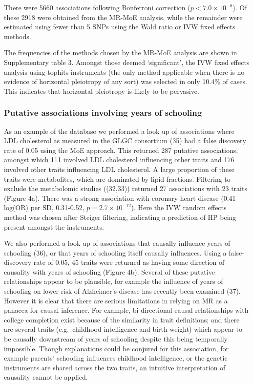 \documentclass[]{article}
\begin{document}
There were 5660 associations following Bonferroni correction
(\(p < 7.0 \times 10^{-8}\)). Of these 2918 were obtained from the
MR-MoE analysis, while the remainder were estimated using fewer than 5
SNPs using the Wald ratio or IVW fixed effects methods.

The frequencies of the methods chosen by the MR-MoE analysis are shown
in Supplementary table 3. Amongst those deemed `significant', the IVW
fixed effects analysis using tophits instruments (the only method
applicable when there is no evidence of horizontal pleiotropy of any
sort) was selected in only 10.4\% of cases. This indicates that
horizontal pleiotropy is likely to be pervasive.

\subsubsection{Putative associations involving years of
schooling}\label{putative-associations-involving-years-of-schooling}

As an example of the database we performed a look up of associations
where LDL cholesterol as measured in the GLGC consortium (35) had a
false discovery rate of 0.05 using the MoE approach. This returned 287
putative associations, amongst which 111 involved LDL cholesterol
influencing other traits and 176 involved other traits influencing LDL
cholesterol. A large proportion of these traits were metabolites, which
are dominated by lipid fractions. Filtering to exclude the metabolomic
studies ((32,33)) returned 27 associations with 23 traits (Figure 4a).
There was a strong association with coronary heart disease (0.41 log(OR)
per SD, 0.31-0.52, \(p=2.7\times10^{-12}\)). Here the IVW random effects
method was chosen after Steiger filtering, indicating a prediction of HP
being present amongst the instruments.

We also performed a look up of associations that causally influence
years of schooling (36), or that years of schooling itself causally
influences. Using a false-discovery rate of 0.05, 45 traits were
returned as having some direction of causality with years of schooling
(Figure 4b). Several of these putative relationships appear to be
plausible, for example the influence of years of schooling on lower risk
of Alzheimer's disease has recently been examined (37). However it is
clear that there are serious limitations in relying on MR as a panacea
for causal inference. For example, bi-directional causal relationships
with college completion exist because of the similarity in trait
definitions; and there are several traits (e.g.~childhood intelligence
and birth weight) which appear to be causally downstream of years of
schooling despite this being temporally impossible. Though explanations
could be conjured for this association, for example parents' schooling
influences childhood intelligence, or the genetic instruments are shared
across the two traits, an intuitive interpretation of causality cannot
be applied.
\end{document}
